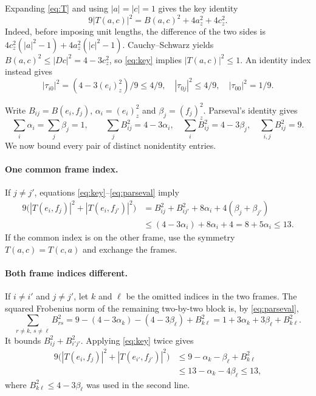 \documentclass[11pt,a4paper]{article}
\begin{document}
Expanding \eqref{eq:T} and using $|a|=|c|=1$ gives the key identity
\begin{equation}\label{eq:key}
 9|T(a,c)|^2=B(a,c)^2+4a_z^2+4c_z^2.
\end{equation}
Indeed, before imposing unit lengths, the difference of the two sides is
$4c_z^2(|a|^2-1)+4a_z^2(|c|^2-1)$.
Cauchy--Schwarz yields $B(a,c)^2\leq|Dc|^2=4-3c_z^2$,
so \eqref{eq:key} implies $|T(a,c)|^2\leq1$.
An identity index instead gives
\begin{equation}\label{eq:idbound}
 |\tau_{i0}|^2=(4-3(e_i)_z^2)/9\leq4/9,
 \quad |\tau_{0j}|^2\leq4/9,\quad |\tau_{00}|^2=1/9.
\end{equation}

Write $B_{ij}=B(e_i,f_j)$, $\alpha_i=(e_i)_z^2$ and
$\beta_j=(f_j)_z^2$. Parseval's identity gives
\begin{equation}\label{eq:parseval}
 \sum_i\alpha_i=\sum_j\beta_j=1,\qquad
 \sum_j B_{ij}^2=4-3\alpha_i,\quad
 \sum_i B_{ij}^2=4-3\beta_j,\quad
 \sum_{i,j}B_{ij}^2=9.
\end{equation}
We now bound every pair of distinct nonidentity entries.

\paragraph{One common frame index.}
If $j\ne j'$, equations \eqref{eq:key}--\eqref{eq:parseval} imply
\begin{align*}
9\bigl(|T(e_i,f_j)|^2+|T(e_i,f_{j'})|^2\bigr)
 &=B_{ij}^2+B_{ij'}^2+8\alpha_i+4(\beta_j+\beta_{j'})\\
 &\leq(4-3\alpha_i)+8\alpha_i+4
   =8+5\alpha_i\leq13.
\end{align*}
If the common index is on the other frame, use the symmetry
$T(a,c)=T(c,a)$ and exchange the frames.

\paragraph{Both frame indices different.}
If $i\ne i'$ and $j\ne j'$, let $k$ and $\ell$ be the omitted
indices in the two frames. The squared Frobenius norm of the remaining
two-by-two block is, by \eqref{eq:parseval},
\[
 \sum_{r\ne k,\,s\ne\ell}B_{rs}^2
 =9-(4-3\alpha_k)-(4-3\beta_\ell)+B_{k\ell}^2
 =1+3\alpha_k+3\beta_\ell+B_{k\ell}^2.
\]
It bounds $B_{ij}^2+B_{i'j'}^2$. Applying \eqref{eq:key} twice gives
\begin{align*}
 9\bigl(|T(e_i,f_j)|^2+|T(e_{i'},f_{j'})|^2\bigr)
 &\leq9-\alpha_k-\beta_\ell+B_{k\ell}^2\\
 &\leq13-\alpha_k-4\beta_\ell\leq13,
\end{align*}
where $B_{k\ell}^2\leq4-3\beta_\ell$ was used in the second line.
\end{document}
